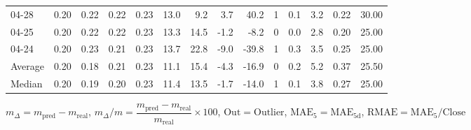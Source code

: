 \begin{threeparttable}
{\begin{tabular}{lrrrrrrrrrrrrr}
  04-28 &          0.20 &          0.22 &          0.22 &        0.23 &                13.0 &                 9.2 &        3.7 &         40.2 &              1 &                 0.1 &              3.2 &            0.22 &                  30.00 \\
  04-25 &          0.20 &          0.22 &          0.22 &        0.23 &                13.3 &                14.5 &       -1.2 &         -8.2 &              0 &                 0.0 &              2.8 &            0.20 &                  25.00 \\
  04-24 &          0.20 &          0.23 &          0.21 &        0.23 &                13.7 &                22.8 &       -9.0 &        -39.8 &              1 &                 0.3 &              3.5 &            0.25 &                  25.00 \\
Average &          0.20 &          0.18 &          0.21 &        0.23 &                11.1 &                15.4 &       -4.3 &        -16.9 &              0 &                 0.2 &              5.2 &            0.37 &                  25.50 \\
 Median &          0.20 &          0.19 &          0.20 &        0.23 &                11.4 &                13.5 &       -1.7 &        -14.0 &              1 &                 0.1 &              3.8 &            0.27 &                  25.00 \\
\bottomrule
\end{tabular}
}
\begin{tablenotes}\footnotesize
\item $m_\Delta=m_{\text{pred}}-m_{\text{real}}$,
$m_\Delta/m=\dfrac{m_{\text{pred}}-m_{\text{real}}}{m_{\text{real}}}\times100$,
$\mathrm{Out}=\text{Outlier}$,
$\mathrm{MAE}_5=\mathrm{MAE}_{5\text{d}}$,
$\mathrm{RMAE}=\mathrm{MAE}_5/\text{Close}$
\end{tablenotes}
\end{threeparttable}
\endgroup

